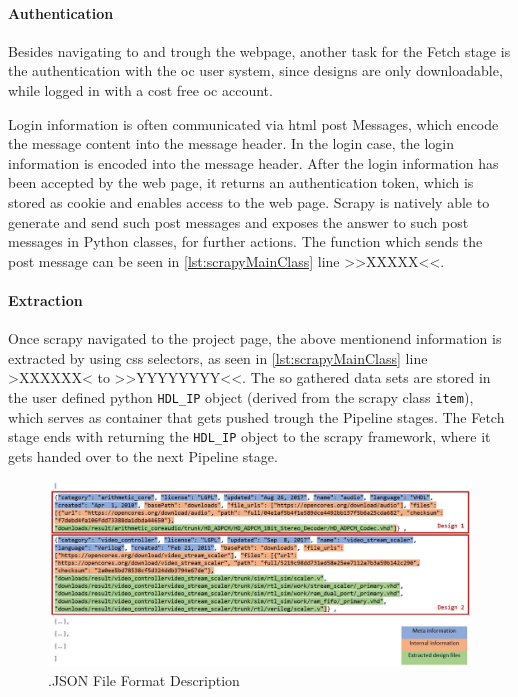 \paragraph*{Authentication \\}

Besides navigating to and trough the webpage, another task for the Fetch stage is the authentication with the \Gls{oc} user system, since designs are only downloadable, while logged in with a cost free \Gls{oc} account.

Login information is often communicated via \Gls{html} \Gls{post} Messages, which encode the message content into the message header. In the login case, the login information is encoded into the message header. After the login information has been accepted by the web page, it returns an authentication token, which is stored as \Gls{cookie} and enables access to the web page. Scrapy is natively able to generate and send such \Gls{post} messages and exposes the answer to such \Gls{post} messages in Python classes, for further actions. The function which sends the \Gls{post} message can be seen in \cref{lst:scrapyMainClass} line >>XXXXX<<.

\paragraph*{Extraction \\}
Once \Gls{scrapy} navigated to the project page, the above mentionend information is extracted by using \Gls{css} selectors, as seen in \cref{lst:scrapyMainClass} line >XXXXXX< to >>YYYYYYYY<<. The so gathered data sets are stored in the user defined \Gls{python} \lstinline{HDL_IP} object (derived from the \Gls{scrapy} class \lstinline{item}), which serves as container that gets pushed trough the Pipeline stages. The Fetch stage ends with returning the \lstinline{HDL_IP} object to the \Gls{scrapy} framework, where it gets handed over to the next Pipeline stage.  

\begin{figure}[h]
	\centering
	\includegraphics[width=\textwidth,keepaspectratio]{fig/jsonFileFormatDescription.JPG}
	\caption{.JSON File Format Description}
	\label{fig:jsonFormat}
\end{figure}

